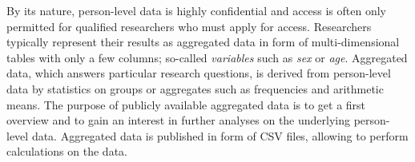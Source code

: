 \documentclass[conference]{IEEEtran}
\newcommand{\tb}[1]{\todo[size=\small, color=green!40]{\textbf{Thomas:} #1}}
\begin{document}
By its nature, person-level data is highly confidential and access is often only permitted for qualified researchers who must apply for access. 
Researchers typically represent their results as aggregated data in form of multi-dimensional tables with only a few columns; so-called \emph{variables} such as \emph{sex} or \emph{age}.
Aggregated data, which answers particular research questions, is derived from person-level data by statistics on groups or aggregates such as frequencies and arithmetic means.
The purpose of publicly available aggregated data is to get a first overview and to gain an interest in further analyses on the underlying person-level data.
Aggregated data is published in form of CSV files,
allowing to perform calculations on the data.
\end{document}
